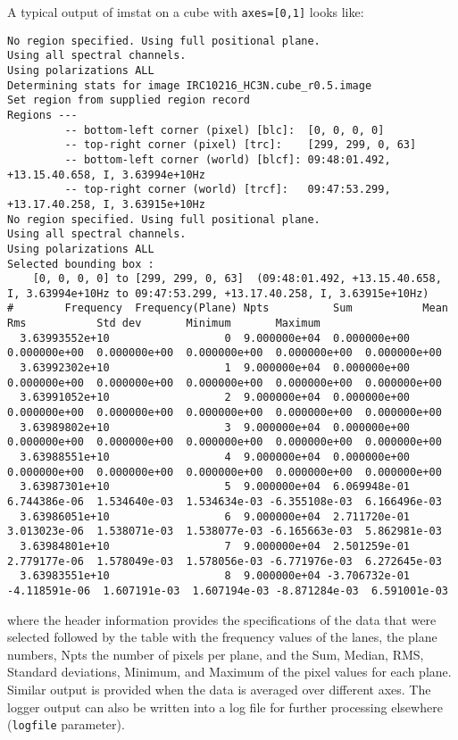 A typical output of imstat on a cube with {\tt axes=[0,1]} looks
like:

\footnotesize
\begin{verbatim}
No region specified. Using full positional plane.
Using all spectral channels.
Using polarizations ALL
Determining stats for image IRC10216_HC3N.cube_r0.5.image
Set region from supplied region record
Regions --- 
         -- bottom-left corner (pixel) [blc]:  [0, 0, 0, 0]
         -- top-right corner (pixel) [trc]:    [299, 299, 0, 63]
         -- bottom-left corner (world) [blcf]: 09:48:01.492, +13.15.40.658, I, 3.63994e+10Hz
         -- top-right corner (world) [trcf]:   09:47:53.299, +13.17.40.258, I, 3.63915e+10Hz
No region specified. Using full positional plane.
Using all spectral channels.
Using polarizations ALL
Selected bounding box : 
    [0, 0, 0, 0] to [299, 299, 0, 63]  (09:48:01.492, +13.15.40.658, I, 3.63994e+10Hz to 09:47:53.299, +13.17.40.258, I, 3.63915e+10Hz)
#        Frequency  Frequency(Plane) Npts          Sum           Mean          Rms           Std dev       Minimum       Maximum     
  3.63993552e+10                  0  9.000000e+04  0.000000e+00  0.000000e+00  0.000000e+00  0.000000e+00  0.000000e+00  0.000000e+00
  3.63992302e+10                  1  9.000000e+04  0.000000e+00  0.000000e+00  0.000000e+00  0.000000e+00  0.000000e+00  0.000000e+00
  3.63991052e+10                  2  9.000000e+04  0.000000e+00  0.000000e+00  0.000000e+00  0.000000e+00  0.000000e+00  0.000000e+00
  3.63989802e+10                  3  9.000000e+04  0.000000e+00  0.000000e+00  0.000000e+00  0.000000e+00  0.000000e+00  0.000000e+00
  3.63988551e+10                  4  9.000000e+04  0.000000e+00  0.000000e+00  0.000000e+00  0.000000e+00  0.000000e+00  0.000000e+00
  3.63987301e+10                  5  9.000000e+04  6.069948e-01  6.744386e-06  1.534640e-03  1.534634e-03 -6.355108e-03  6.166496e-03
  3.63986051e+10                  6  9.000000e+04  2.711720e-01  3.013023e-06  1.538071e-03  1.538077e-03 -6.165663e-03  5.862981e-03
  3.63984801e+10                  7  9.000000e+04  2.501259e-01  2.779177e-06  1.578049e-03  1.578056e-03 -6.771976e-03  6.272645e-03
  3.63983551e+10                  8  9.000000e+04 -3.706732e-01 -4.118591e-06  1.607191e-03  1.607194e-03 -8.871284e-03  6.591001e-03
\end{verbatim}

where the header information provides the specifications of the data
that were selected followed by the table with the frequency values of
the lanes, the plane numbers,
Npts the number of pixels per plane, and the Sum, Median, RMS, Standard
deviations, Minimum, and Maximum of the pixel values for each
plane. Similar output is provided when the data is averaged over
different axes. The logger output can also be written into a log file
for further processing elsewhere ({\tt logfile} parameter). 


